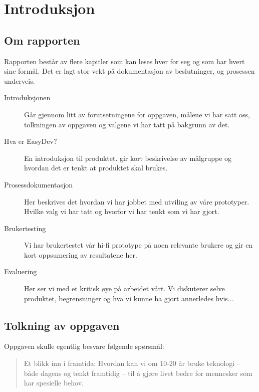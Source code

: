 \chapter{Introduksjon}

\section{Om rapporten}
Rapporten består av flere kapitler som kan leses hver for seg og som har hvert sine formål. Det er lagt stor vekt på dokumentasjon av beslutninger, og prosessen underveis.



\begin{description}

\item[Introduksjonen] Går gjennom litt av forutsetningene for oppgaven, målene vi har satt oss, tolkningen av oppgaven og valgene vi har tatt på bakgrunn av det. 

\item[Hva er EasyDev?] En introduksjon til produktet. gir kort beskrivelse av målgruppe og hvordan det er tenkt at produktet skal brukes.

\item[Prosessdokumentasjon] Her beskrives det hvordan vi har jobbet med utviling av våre prototyper. Hvilke valg vi har tatt og hvorfor vi har tenkt som vi har gjort.

\item[Brukertesting] Vi har brukertestet vår hi-fi prototype på noen relevante brukere og gir en kort oppsumering av resultatene her.

\item[Evaluering] Her ser vi med et kritisk øye på arbeidet vårt. Vi diskuterer selve produktet, begrensninger og hva vi kunne ha gjort annerledes hvis...

\end{description}



\section{Tolkning av oppgaven}
Oppgaven skulle egentlig besvare følgende spørsmål: 
\begin{quote}
Et	blikk	inn	i	framtida:	Hvordan	kan	vi	om	10-20	år	bruke	teknologi	
– både	dagens	og	tenkt	framtidig	– til	å	gjøre	livet	bedre	for	
mennesker	som	har	spesielle behov.
\end{quote}

